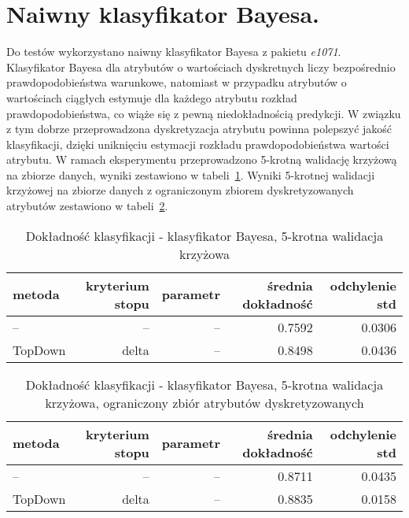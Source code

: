 \section{Naiwny klasyfikator Bayesa.}
Do testów wykorzystano naiwny klasyfikator Bayesa z pakietu \emph{e1071}. Klasyfikator Bayesa dla atrybutów o wartościach dyskretnych liczy bezpośrednio prawdopodobieństwa warunkowe, natomiast w przypadku atrybutów o wartościach ciągłych estymuje dla każdego atrybutu rozkład prawdopodobieństwa, co wiąże się z pewną niedokładnością predykcji. W związku z tym dobrze przeprowadzona dyskretyzacja atrybutu powinna polepszyć jakość klasyfikacji, dzięki uniknięciu estymacji rozkładu prawdopodobieństwa wartości atrybutu. W ramach eksperymentu przeprowadzono 5-krotną walidację krzyżową na zbiorze danych, wyniki zestawiono w tabeli~\ref{tab:bayes_full_set}. Wyniki 5-krotnej walidacji krzyżowej na zbiorze danych z ograniczonym zbiorem dyskretyzowanych atrybutów zestawiono w tabeli~\ref{tab:bayes_reduced_set}.

\begin{table}[h!]
\begin{center}
\begin{tabular}{lrrrr}
\toprule
metoda & kryterium stopu & parametr & średnia dokładność & odchylenie std \\
\midrule
--       & --    & -- & 0.7592 & 0.0306 \\
TopDown  & delta & -- & 0.8498 & 0.0436 \\
\bottomrule
\end{tabular}
\caption{Dokładność klasyfikacji - klasyfikator Bayesa, 5-krotna walidacja krzyżowa}
\label{tab:bayes_full_set}
\end{center}

\end{table}
\begin{table}[h!]
\begin{center}
\begin{tabular}{lrrrr}
\toprule
metoda & kryterium stopu & parametr & średnia dokładność & odchylenie std \\
\midrule
--       & --    & -- & 0.8711 & 0.0435 \\
TopDown  & delta & -- & 0.8835 & 0.0158 \\
\bottomrule
\end{tabular}
\caption{Dokładność klasyfikacji - klasyfikator Bayesa, 5-krotna walidacja krzyżowa, ograniczony zbiór atrybutów dyskretyzowanych}
\label{tab:bayes_reduced_set}
\end{center}
\end{table}

